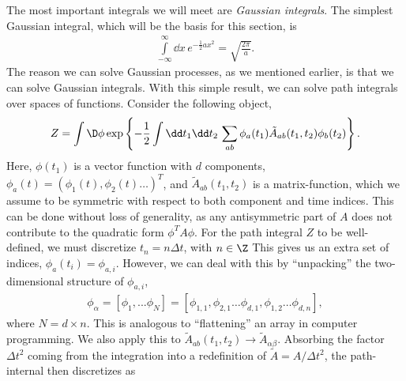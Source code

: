 The most important integrals we will meet are \emph{Gaussian integrals}.
The simplest Gaussian integral, which will be the basis for this section, is
%
\begin{align}\label{eq: gaussian integral}
    \int\limits_{-\infty}^\infty \dd x \, e^{-\frac{1}{2} a x^2} = \sqrt{ \frac{ 2 \pi  }{ a }}.
\end{align}
%
The reason we can solve Gaussian processes, as we mentioned earlier, is that we can solve Gaussian integrals.
With this simple result, we can solve path integrals over spaces of functions.
Consider the following object, 
%
\begin{align}
    Z = \int \D \phi
    \exp \left\{ 
        - \frac{1}{2} \int \dd t_1 \dd t_2 \, 
        \sum_{ab}
        \phi_a(t_1) \tilde{A}_{ab}(t_1, t_2) \phi_b(t_2)
    \right\}.
\end{align}
%
Here, $\phi(t_1)$ is a vector function with $d$ components, $\phi_a(t) = (\phi_1(t), \phi_2(t)\dots)^T$, and $\tilde{A}_{ab}(t_1, t_2)$ is a matrix-function, which we assume to be symmetric with respect to both component and time indices.
This can be done without loss of generality, as any antisymmetric part of $A$ does not contribute to the quadratic form $\phi^T A \phi$.
For the path integral $Z$ to be well-defined, we must discretize $t_n = n \Delta t$, with $n \in \Z$
This gives us an extra set of indices, $\phi_a(t_i) = \phi_{a,i}$.
However, we can deal with this by ``unpacking'' the two-dimensional structure of $\phi_{a,i}$,
%
\begin{align}
    \phi_\alpha = 
    \left[\phi_1, ... \phi_N\right]
    =
    \left[
        \phi_{1, 1}, \phi_{2, 1}\dots\phi_{d,1}, \phi_{1, 2}\dots\phi_{d, n}
    \right],
\end{align}
%
where $N = d \times n$.
This is analogous to ``flattening'' an array in computer programming.
We also apply this to $\tilde{A}_{ab}(t_1,t_2) \to \tilde{A}_{\alpha\beta}$.
Absorbing the factor $\Delta t^2$ coming from the integration into a redefinition of $\tilde{A} = A/\Delta t^2$,
%
the path-internal then discretizes as 
